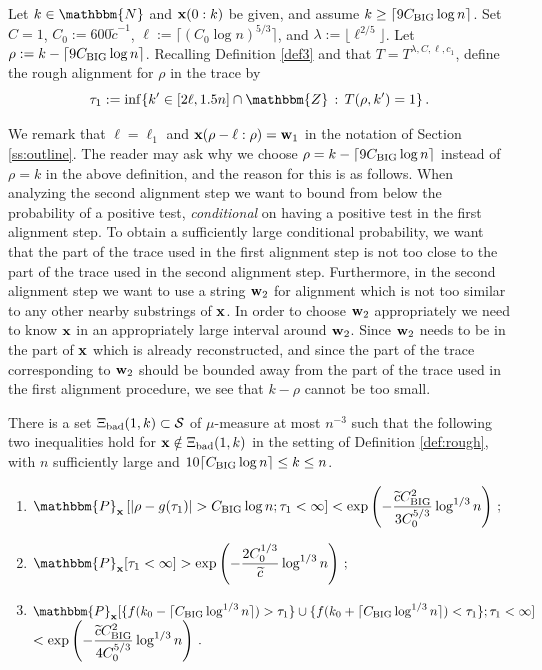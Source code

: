 \documentclass[final,12pt]{colt2018} %
\newcommand{\N}{\mathbbm{N}}
\newcommand{\Z}{\mathbbm{Z}}
\renewcommand{\P}{\mathbbm{P}}
\newcommand{\1}{\mathbf{1}}
\def\disp{\displaystyle}
\def\cS{\mathcal{S}}
\def\cS{\mathcal{S}}
\newcommand{\wt}{\widetilde}
\def\x{{\bf x}}
\def\w{{\bf w}}
\def\ct{{\wt c}}
\def\chuge{C_{\rm BIG}}
\def\bad{{\Xi_{\rm bad}}}
\def\rough{{\rho}}
\begin{document}
\begin{definition} \label{def:rough}
	Let $k \in \N$ and $\x(0:k)$ be given, and assume $k\geq\lceil 9\chuge \log n \rceil$.  Set $C=1$, $C_0 := 600 \ct^{-1}$,
	$\ell := \lceil (C_0 \log n)^{5/3} \rceil$, and
	$\lambda := \lfloor \ell^{2/5}\rfloor$.
	Let $\rough := k - \lceil 9 \chuge \log n \rceil$.
	Recalling Definition \ref{def3} and that $T=T^{\lambda,C,\ell,c_1}$, define the rough alignment for $\rough$ in the trace by
	$$\tau_1 := \inf \{ k' \in [2 \ell , 1.5 n]\cap\Z \, : \,
	T(\rough , k') = 1 \} \, .$$
\end{definition}
We remark that $\ell=\ell_1$ and $\x(\rho-\ell:\rho)=\w_1$ in the notation of Section \ref{ss:outline}. The reader may ask why we choose $\rough = k - \lceil 9 \chuge \log n \rceil$ instead of $\rough = k$ in the above definition, and the reason for this is as follows. When analyzing the second alignment step we want to bound from below the probability of a positive test, \emph{conditional} on having a positive test in the first alignment step. To obtain a sufficiently large conditional probability, we want that the part of the trace used in the first alignment step is not too close to the part of the trace used in the second alignment step. Furthermore, in the second alignment step we want to use a string $\w_2$ for alignment which is not too similar to any other nearby substrings of $\x$. In order to choose $\w_2$ appropriately we need to know $\x$ in an appropriately large interval around $\w_2$. Since $\w_2$ needs to be in the part of $\x$ which is already reconstructed, and since the part of the trace corresponding to $\w_2$ should be bounded away from the part of the trace used in the first alignment procedure, we see that $k-\rho$ cannot be too small.

\begin{lemma} \label{prop12}
	There is a set $\bad (1,k)\subset\cS$ of $\mu$-measure at most $n^{-3}$ such that
	the following two inequalities hold for $\x \notin \bad (1,k)$ in the setting of Definition \ref{def:rough},
	with $n$ sufficiently large and $10 \lceil \chuge \log n \rceil\leq k\leq n$.
	\begin{enumerate}[$(i)$]
		\item $\disp
		\P_\x \left [ |\rough - g(\tau_1)| > \chuge \log n ; \tau_1 < \infty \right ]
		< \exp \left ( - \frac{\ct \chuge^2}{3 C_0^{5/3}} \log^{1/3} n
		\right ) \, ;$
		\item $\disp \P_\x [ \tau_1 < \infty] >
		\exp \left ( - \frac{2 C_0^{1/3}}{\ct} \log^{1/3} n \right ) \, ;$
		\item $\disp \P_\x[ \{ f(k_0- \lceil \chuge \log^{1/3}n \rceil )>\tau_1 \}\cup\{ f(k_0+\lceil \chuge \log^{1/3}n \rceil)<\tau_1 \} ; \tau_1<\infty ]$ \newline
		$\disp < \exp \left ( - \frac{\ct \chuge^2}{4 C_0^{5/3}} \log^{1/3} n
		\right ) \,. $
	\end{enumerate}
\end{lemma}
\end{document}
